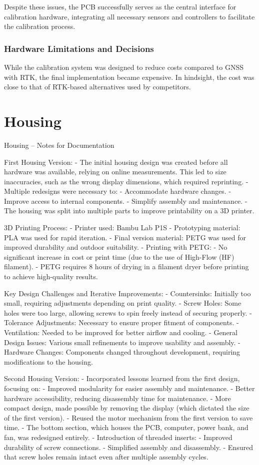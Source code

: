 Despite these issues, the PCB successfully serves as the central interface for calibration hardware, integrating all necessary sensors and controllers to facilitate the calibration process.

\subsubsection*{Hardware Limitations and Decisions}
While the calibration system was designed to reduce costs compared to GNSS with RTK, the final implementation became expensive. In hindsight, the cost was close to that of RTK-based alternatives used by competitors.

\section{Housing}

Housing – Notes for Documentation

First Housing Version:
- The initial housing design was created before all hardware was available, relying on online measurements. This led to size inaccuracies, such as the wrong display dimensions, which required reprinting.
- Multiple redesigns were necessary to:
- Accommodate hardware changes.
- Improve access to internal components.
- Simplify assembly and maintenance.
- The housing was split into multiple parts to improve printability on a 3D printer.

3D Printing Process:
- Printer used: Bambu Lab P1S
- Prototyping material: PLA was used for rapid iteration.
- Final version material: PETG was used for improved durability and outdoor suitability.
- Printing with PETG:
- No significant increase in cost or print time (due to the use of High-Flow (HF) filament).
- PETG requires 8 hours of drying in a filament dryer before printing to achieve high-quality results.

Key Design Challenges and Iterative Improvements:
- Countersinks: Initially too small, requiring adjustments depending on print quality.
- Screw Holes: Some holes were too large, allowing screws to spin freely instead of securing properly.
- Tolerance Adjustments: Necessary to ensure proper fitment of components.
- Ventilation: Needed to be improved for better airflow and cooling.
- General Design Issues: Various small refinements to improve usability and assembly.
- Hardware Changes: Components changed throughout development, requiring modifications to the housing.

Second Housing Version:
- Incorporated lessons learned from the first design, focusing on:
- Improved modularity for easier assembly and maintenance.
- Better hardware accessibility, reducing disassembly time for maintenance.
- More compact design, made possible by removing the display (which dictated the size of the first version).
- Reused the motor mechanism from the first version to save time.
- The bottom section, which houses the PCB, computer, power bank, and fan, was redesigned entirely.
- Introduction of threaded inserts:
- Improved durability of screw connections.
- Simplified assembly and disassembly.
- Ensured that screw holes remain intact even after multiple assembly cycles.

